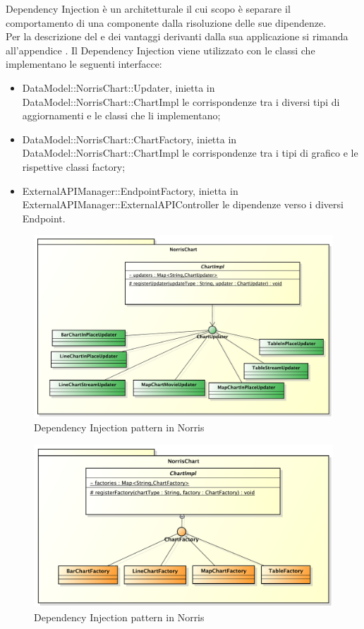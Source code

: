 			Dependency Injection è un  architetturale il cui scopo è separare il comportamento di una componente dalla risoluzione delle sue dipendenze.\\
			Per la descrizione del  e dei vantaggi derivanti dalla sua applicazione si rimanda all'appendice .
				Il  Dependency Injection viene utilizzato con le classi che implementano le seguenti interfacce:
				\begin{itemize}
					\item DataModel::NorrisChart::Updater, inietta in DataModel::NorrisChart::ChartImpl le corrispondenze tra i diversi tipi di aggiornamenti e le classi che li implementano;
					\item DataModel::NorrisChart::ChartFactory, inietta in DataModel::NorrisChart::ChartImpl le  corrispondenze tra i tipi di grafico e le rispettive classi factory;
					\item ExternalAPIManager::EndpointFactory, inietta in ExternalAPIManager::ExternalAPIController le dipendenze verso i diversi Endpoint.
				\end{itemize}
				\begin{figure}[H]\centering
	        		\includegraphics[width=\textwidth]{SpecificaTecnica/Pics/DesignPatternNorris/DependencyInjection1}
	        		\caption{Dependency Injection pattern in Norris}
	    		\end{figure}
	    		\begin{figure}[H]\centering
	        		\includegraphics[width=\textwidth]{SpecificaTecnica/Pics/DesignPatternNorris/DependencyInjection2}
	        		\caption{Dependency Injection pattern in Norris}
	    		\end{figure}

